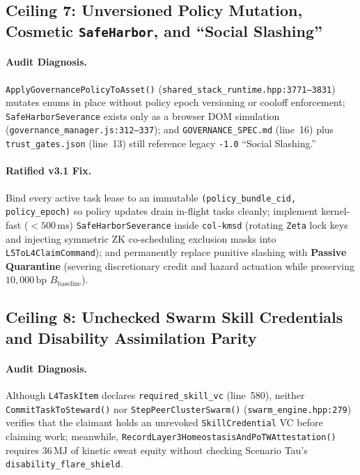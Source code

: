 \subsection{Ceiling 7: Unversioned Policy Mutation, Cosmetic \texttt{SafeHarbor}, and ``Social Slashing''}

\paragraph{Audit Diagnosis.}
\texttt{ApplyGovernancePolicyToAsset()} (\texttt{shared\_stack\_runtime.hpp:3771--3831}) mutates
enums in place without policy epoch versioning or cooloff enforcement;
\texttt{SafeHarborSeverance} exists only as a browser DOM simulation
(\texttt{governance\_manager.js:312--337}); and \texttt{GOVERNANCE\_SPEC.md} (line~16) plus
\texttt{trust\_gates.json} (line~13) still reference legacy \texttt{-1.0} ``Social Slashing.''

\paragraph{Ratified v3.1 Fix.}
Bind every active task lease to an immutable \texttt{(policy\_bundle\_cid, policy\_epoch)} so
policy updates drain in-flight tasks cleanly; implement kernel-fast ($<500\,\mathrm{ms}$)
\texttt{SafeHarborSeverance} inside \texttt{col-kmsd} (rotating \texttt{Zeta} lock keys and
injecting symmetric ZK co-scheduling exclusion masks into \texttt{L5ToL4ClaimCommand}); and
permanently replace punitive slashing with \textbf{Passive Quarantine} (severing discretionary credit
and hazard actuation while preserving $10{,}000\,\mathrm{bp}$ $B_{\mathrm{baseline}}$).

\subsection{Ceiling 8: Unchecked Swarm Skill Credentials and Disability Assimilation Parity}

\paragraph{Audit Diagnosis.}
Although \texttt{L4TaskItem} declares \texttt{required\_skill\_vc} (line~580), neither
\texttt{CommitTaskToSteward()} nor \texttt{StepPeerClusterSwarm()} (\texttt{swarm\_engine.hpp:279})
verifies that the claimant holds an unrevoked \texttt{SkillCredential} VC before claiming work;
meanwhile, \texttt{RecordLayer3HomeostasisAndPoTWAttestation()} requires $36\,\mathrm{MJ}$ of
kinetic sweat equity without checking Scenario Tau's \texttt{disability\_flare\_shield}.

